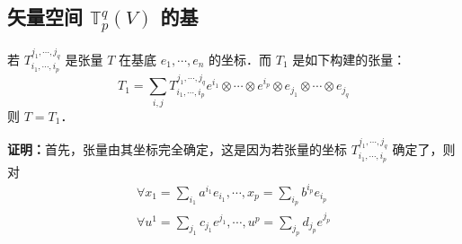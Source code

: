 \subsection{矢量空间 $\mathbb T^q_p(V)$ 的基}
\begin{theorem}{}
若 $T^{j_1,\cdots,j_q}_{i_1,\cdots,i_p}$ 是张量 $T$ 在基底 ${e_1,\cdots,e_n}$ 的坐标．而 $T_1$ 是如下构建的张量：
\begin{equation}
T_1=\sum_{i,j}T^{j_1,\cdots,j_q}_{i_1,\cdots,i_p}e^{i_1}\otimes\cdots\otimes e^{i_p}\otimes e_{j_1}\otimes\cdots\otimes e_{j_q}
\end{equation}
则 $T=T_1$．
\end{theorem}
\textbf{证明：}首先，张量由其坐标完全确定，这是因为若张量的坐标 $T^{j_1,\cdots,j_q}_{i_1,\cdots,i_p}$ 确定了，则对
\begin{equation}
\begin{aligned}
\forall x_1=\sum_{i_1}a^{i_1}e_{i_1},\cdots,x_p=\sum_{i_p}b^{i_p}e_{i_p}\\
\forall u^1=\sum_{j_1}c_{j_1}e^{j_1},\cdots,u^p=\sum_{j_p}d_{j_p}e^{j_p}
\end{aligned}
\end{equation}
